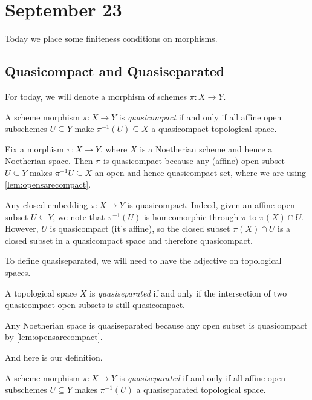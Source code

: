 \documentclass[../notes.tex]{subfiles}
\begin{document}
\section{September 23}

Today we place some finiteness conditions on morphisms.

\subsection{Quasicompact and Quasiseparated}
For today, we will denote a morphism of schemes $\pi\colon X\to Y$.
\begin{definition}[Quasicompact]
	A scheme morphism $\pi\colon X\to Y$ is \textit{quasicompact} if and only if all affine open subschemes $U\subseteq Y$ make $\pi^{-1}(U)\subseteq X$ a quasicompact topological space.
\end{definition}
\begin{example}
	Fix a morphism $\pi\colon X\to Y$, where $X$ is a Noetherian scheme and hence a Noetherian space. Then $\pi$ is quasicompact because any (affine) open subset $U\subseteq Y$ makes $\pi^{-1}U\subseteq X$ an open and hence quasicompact set, where we are using \autoref{lem:opensarecompact}.
\end{example}
\begin{example}
	Any closed embedding $\pi\colon X\to Y$ is quasicompact. Indeed, given an affine open subset $U\subseteq Y$, we note that $\pi^{-1}(U)$ is homeomorphic through $\pi$ to $\pi(X)\cap U$. However, $U$ is quasicompact (it's affine), so the closed subset $\pi(X)\cap U$ is a closed subset in a quasicompact space and therefore quasicompact.
\end{example}
To define quasiseparated, we will need to have the adjective on topological spaces.
\begin{definition}[Quasiseperated]
	A topological space $X$ is \textit{quasiseparated} if and only if the intersection of two quasicompact open subsets is still quasicompact.
\end{definition}
\begin{example}
	Any Noetherian space is quasiseparated because any open subset is quasicompact by \autoref{lem:opensarecompact}.
\end{example}
And here is our definition.
\begin{defi}[Quasiseparated]
	A scheme morphism $\pi\colon X\to Y$ is \textit{quasiseparated} if and only if all affine open subschemes $U\subseteq Y$ makes $\pi^{-1}(U)$ a quasiseparated topological space.
\end{defi}
\end{document}
